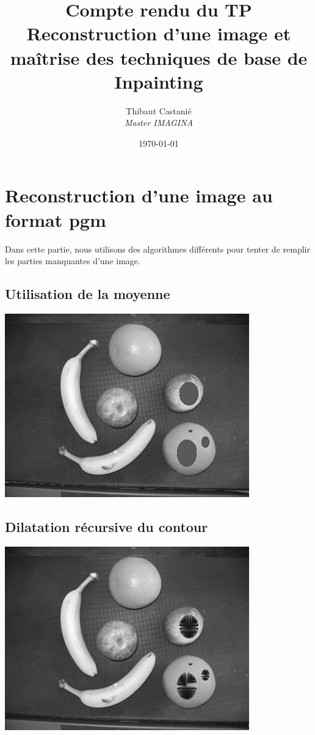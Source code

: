 \documentclass[a4paper,11pt]{article}
\begin{document}
\title{Compte rendu du TP \\\textbf{Reconstruction d'une image et maîtrise des techniques de base de Inpainting}}
\author{Thibaut Castanié\\\textit{Master IMAGINA}}
\date{\today}

\maketitle
\thispagestyle{empty}
\newpage

\section{Reconstruction d'une image au format pgm}
Dans cette partie, nous utilisons des algorithmes différents pour tenter de remplir les parties manquantes d'une image.
\subsection{Utilisation de la moyenne}
\begin{center}
\includegraphics[scale=0.7]{fruitMoyenne.png}
\end{center}

\subsection{Dilatation récursive du contour}
\begin{center}
\includegraphics[scale=0.7]{fruitdilatation19.png}
\end{center}
\end{document}

